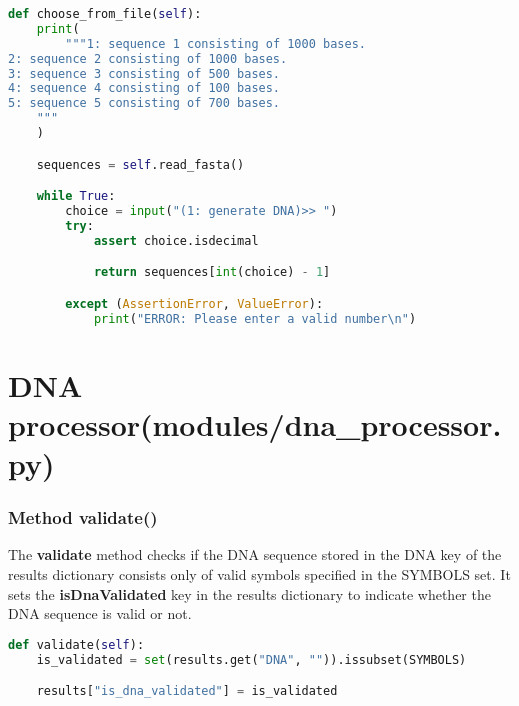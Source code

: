 \documentclass[11pt]{article}
\begin{document}
\begin{lstlisting}[language=Python, style=PythonStyle]
def choose_from_file(self):
    print(
        """1: sequence 1 consisting of 1000 bases.
2: sequence 2 consisting of 1000 bases.
3: sequence 3 consisting of 500 bases.
4: sequence 4 consisting of 100 bases.
5: sequence 5 consisting of 700 bases.
    """
    )

    sequences = self.read_fasta()

    while True:
        choice = input("(1: generate DNA)>> ")
        try:
            assert choice.isdecimal

            return sequences[int(choice) - 1]

        except (AssertionError, ValueError):
            print("ERROR: Please enter a valid number\n")
\end{lstlisting}

\section{DNA processor(modules/dna\_processor.py)}
\subsubsection{Method validate()}
The \textbf{validate} method checks if the DNA sequence stored in the DNA key of the results dictionary consists only of valid symbols specified in the SYMBOLS set. It sets the \textbf{isDnaValidated} key in the results dictionary to indicate whether the DNA sequence is valid or not.
\begin{lstlisting}[language=Python, style=PythonStyle]
def validate(self):
    is_validated = set(results.get("DNA", "")).issubset(SYMBOLS)

    results["is_dna_validated"] = is_validated
\end{lstlisting}
\end{document}
